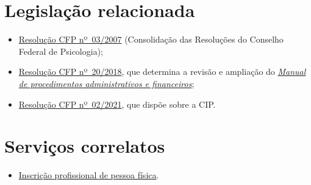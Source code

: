 \section{Legislação relacionada}

\begin{itemize}
\item
  \href{https://atosoficiais.com.br/cfp/resolucao-administrativa-financeira-n-3-2007-institui-a-consolidacao-das-resolucoes-do-conselho-federal-de-psicologia?origin=instituicao&q=resolu\%C3\%A7\%C3\%A3o\%203/2007}{Resolução CFP nº~03/2007} (Consolidação das Resoluções do Conselho Federal de Psicologia);
\item
  \href{https://atosoficiais.com.br/cfp/resolucao-administrativa-financeira-n-20-2018-altera-o-manual-de-procedimentos-administrativo-e-financeiro-do-sistema-conselhos-de-psicologia-anexo-da-resolucao-cfp-n-202018-a-resolucao-cfp-n-03-2007-a-resolucao-cfp-n-16-2019-e-da-outras-providencias}{Resolução
  CFP nº~20/2018}, que determina a revisão e ampliação do \href{https://transparencia.cfp.org.br/wp-content/uploads/sites/7/2020/05/Manual-de-Procedimentos-Administrativos-e-Financeiro-CFP-RES-20.2018.pdf}{\emph{Manual de procedimentos administrativos e financeiros}};
\item
  \href{https://atosoficiais.com.br/cfp/resolucao-administrativa-financeira-n-2-2021-dispoe-sobre-a-confeccao-a-expedicao-e-o-recolhimento-de-carteiras-de-identidade-profissional-das-os-psicologas-os-revoga-o-capitulo-vi-da-resolucao-cfp-no-03-2007-os-1o-2o-4o-5o-do-art-2o-da-resolucao-cfp-no-02-2007-1o-4o-5o-do-art-2o-e-1o-do-art-4o-da-resolucao-cfp-no-01-1984-e-da-outras-providencias}{Resolução CFP nº~02/2021}, que dispõe sobre a CIP.
\end{itemize}

\section{Serviços correlatos}

\begin{itemize}
\item
  \hyperref[chap:pf-inscricao]{Inscrição profissional de pessoa física}.
\end{itemize}

\sumario